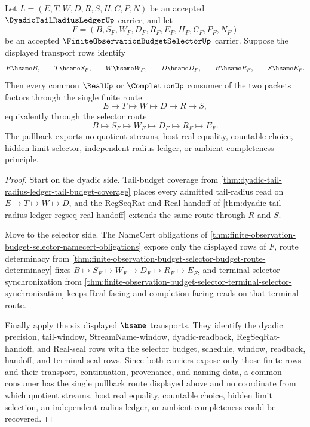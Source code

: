 \begin{theorem}
\label{thm:dyadic-tail-radius-ledger-budget-selector-pullback}
Let $L=(E,T,W,D,R,S,H,C,P,N)$ be an accepted $\DyadicTailRadiusLedgerUp$ carrier, and let
$$
F=(B,S_F,W_F,D_F,R_F,E_F,H_F,C_F,P_F,N_F)
$$
be an accepted $\FiniteObservationBudgetSelectorUp$ carrier. Suppose the displayed transport rows identify
$$
E \hsame B,\qquad T \hsame S_F,\qquad W \hsame W_F,\qquad D \hsame D_F,\qquad R \hsame R_F,\qquad S \hsame E_F.
$$
Then every common $\RealUp$ or $\CompletionUp$ consumer of the two packets factors through the single finite route
$$
E \longmapsto T \longmapsto W \longmapsto D \longmapsto R \longmapsto S,
$$
equivalently through the selector route
$$
B \longmapsto S_F \longmapsto W_F \longmapsto D_F \longmapsto R_F \longmapsto E_F.
$$
The pullback exports no quotient streams, host real equality, countable choice, hidden limit selector, independent radius ledger, or ambient completeness principle.
\end{theorem}
\begin{proof}
Start on the dyadic side. Tail-budget coverage from \autoref{thm:dyadic-tail-radius-ledger-tail-budget-coverage} places every admitted tail-radius read on $E \longmapsto T \longmapsto W \longmapsto D$, and the RegSeqRat and Real handoff of \autoref{thm:dyadic-tail-radius-ledger-regseq-real-handoff} extends the same route through $R$ and $S$.

Move to the selector side. The NameCert obligations of \autoref{thm:finite-observation-budget-selector-namecert-obligations} expose only the displayed rows of $F$, route determinacy from \autoref{thm:finite-observation-budget-selector-budget-route-determinacy} fixes $B \longmapsto S_F \longmapsto W_F \longmapsto D_F \longmapsto R_F \longmapsto E_F$, and terminal selector synchronization from \autoref{thm:finite-observation-budget-selector-terminal-selector-synchronization} keeps Real-facing and completion-facing reads on that terminal route.

Finally apply the six displayed $\hsame$ transports. They identify the dyadic precision, tail-window, StreamName-window, dyadic-readback, RegSeqRat-handoff, and Real-seal rows with the selector budget, schedule, window, readback, handoff, and terminal seal rows. Since both carriers expose only those finite rows and their transport, continuation, provenance, and naming data, a common consumer has the single pullback route displayed above and no coordinate from which quotient streams, host real equality, countable choice, hidden limit selection, an independent radius ledger, or ambient completeness could be recovered.
\end{proof}

